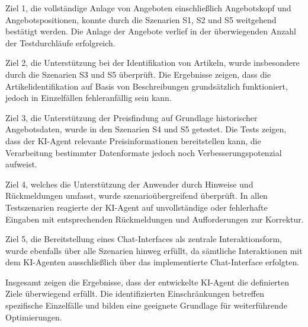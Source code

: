 Ziel 1, die vollständige Anlage von Angeboten einschließlich Angebotskopf und Angebotspositionen, konnte durch die Szenarien S1, S2 und S5 weitgehend bestätigt werden. Die Anlage der Angebote verlief in der überwiegenden Anzahl der Testdurchläufe erfolgreich.

Ziel 2, die Unterstützung bei der Identifikation von Artikeln, wurde insbesondere durch die Szenarien S3 und S5 überprüft. Die Ergebnisse zeigen, dass die Artikelidentifikation auf Basis von Beschreibungen grundsätzlich funktioniert, jedoch in Einzelfällen fehleranfällig sein kann.

Ziel 3, die Unterstützung der Preisfindung auf Grundlage historischer Angebotsdaten, wurde in den Szenarien S4 und S5 getestet. Die Tests zeigen, dass der \ac{KI}-Agent relevante Preisinformationen bereitstellen kann, die Verarbeitung bestimmter Datenformate jedoch noch Verbesserungspotenzial aufweist.

Ziel 4, welches die Unterstützung der Anwender durch Hinweise und Rückmeldungen umfasst, wurde szenarioübergreifend überprüft. In allen Testszenarien reagierte der \ac{KI}-Agent auf unvollständige oder fehlerhafte Eingaben mit entsprechenden Rückmeldungen und Aufforderungen zur Korrektur.

Ziel 5, die Bereitstellung eines Chat-Interfaces als zentrale Interaktionsform, wurde ebenfalls über alle Szenarien hinweg erfüllt, da sämtliche Interaktionen mit dem \ac{KI}-Agenten ausschließlich über das implementierte Chat-Interface erfolgten.

Insgesamt zeigen die Ergebnisse, dass der entwickelte \ac{KI}-Agent die definierten Ziele überwiegend erfüllt. Die identifizierten Einschränkungen betreffen spezifische Einzelfälle und bilden eine geeignete Grundlage für weiterführende Optimierungen.

